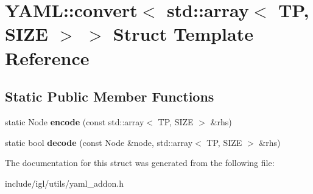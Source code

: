 \hypertarget{structYAML_1_1convert_3_01std_1_1array_3_01TP_00_01SIZE_01_4_01_4}{}\section{Y\+A\+ML\+:\+:convert$<$ std\+:\+:array$<$ TP, S\+I\+ZE $>$ $>$ Struct Template Reference}
\label{structYAML_1_1convert_3_01std_1_1array_3_01TP_00_01SIZE_01_4_01_4}
\subsection*{Static Public Member Functions}
\begin{DoxyCompactItemize}
\item 
\mbox{\label{structYAML_1_1convert_3_01std_1_1array_3_01TP_00_01SIZE_01_4_01_4_a1eeed03353acfe9bd2a8c97a8904f498}} 
static Node {\bfseries encode} (const std\+::array$<$ TP, S\+I\+ZE $>$ \&rhs)
\item 
\mbox{\label{structYAML_1_1convert_3_01std_1_1array_3_01TP_00_01SIZE_01_4_01_4_ae3cd9a7f90106511270f06bde606c427}} 
static bool {\bfseries decode} (const Node \&node, std\+::array$<$ TP, S\+I\+ZE $>$ \&rhs)
\end{DoxyCompactItemize}


The documentation for this struct was generated from the following file\+:\begin{DoxyCompactItemize}
\item 
include/igl/utils/yaml\+\_\+addon.\+h\end{DoxyCompactItemize}
